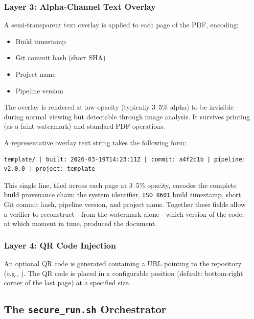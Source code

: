 \documentclass[
  english,
]{article}
\providecommand{\tightlist}{%
  \setlength{\itemsep}{0pt}\setlength{\parskip}{0pt}}
\begin{document}
\subsubsection{Layer 3: Alpha-Channel Text
Overlay}\label{layer-3-alpha-channel-text-overlay}

A semi-transparent text overlay is applied to each page of the PDF,
encoding:

\begin{itemize}
\tightlist
\item
  Build timestamp
\item
  Git commit hash (short SHA)
\item
  Project name
\item
  Pipeline version
\end{itemize}

The overlay is rendered at low opacity (typically 3--5\% alpha) to be
invisible during normal viewing but detectable through image analysis.
It survives printing (as a faint watermark) and standard PDF operations.

A representative overlay text string takes the following form:

\begin{verbatim}
template/ | built: 2026-03-19T14:23:11Z | commit: a4f2c1b | pipeline: v2.0.0 | project: template
\end{verbatim}

This single line, tiled across each page at 3--5\% opacity, encodes the
complete build provenance chain: the system identifier,
\texttt{ISO\ 8601} build timestamp, short Git commit hash, pipeline
version, and project name. Together these fields allow a verifier to
reconstruct---from the watermark alone---which version of the code, at
which moment in time, produced the document.

\subsubsection{Layer 4: QR Code
Injection}\label{layer-4-qr-code-injection}

An optional QR code is generated containing a URL pointing to the
repository (e.g., ). The QR code
is placed in a configurable position (default: bottom-right corner of
the last page) at a specified size.

\subsection{\texorpdfstring{The \texttt{secure\_run.sh}
Orchestrator}{The secure_run.sh Orchestrator}}\label{the-secure_run.sh-orchestrator}
\end{document}
